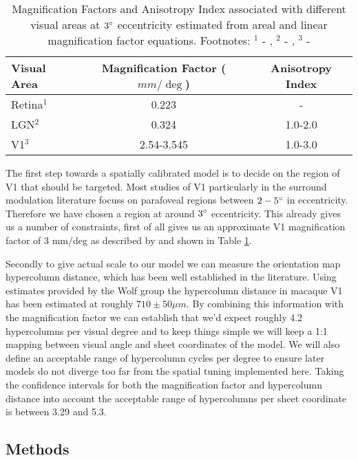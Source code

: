 \begin{table}
\centering
\begin{tabular}{l | c c}
  \hline
  \hline
  Visual Area     & Magnification Factor ($mm/\deg$) & Anisotropy Index \\
  \hline
  Retina$^1$      & 0.223                            & -                      \\
  LGN$^2$         & 0.324                             & 1.0-2.0                \\
  V1$^3$          & 2.54-3.545                       & 1.0-3.0                \\
  \hline
\end{tabular}
\caption[]%
{Magnification Factors and Anisotropy Index associated with different visual areas at $3\degree$ eccentricity estimated from areal and linear magnification factor equations. Footnotes: $^1$ - \cite{Perry1985}, $^2$ - \cite{Connolly1984}, $^3$ - \cite{VanEssen1984}}
\label{MFs}
\end{table}

The first step towards a spatially calibrated model is to decide on
the region of V1 that should be targeted. Most studies of V1
particularly in the surround modulation literature focuss on parafoveal
regions between $2-5\degree$ in eccentricity. Therefore we have chosen
a region at around $3\degree$ eccentricity. This already gives us a
number of constraints, first of all gives us an approximate V1
magnification factor of 3 mm/deg as described by \cite{VanEssen1984}
and shown in Table \ref{MFs}.

Secondly to give actual scale to our model we can measure the
orientation map hypercolumn distance, which has been well established
in the literature. Using estimates provided by the Wolf group the
hypercolumn distance in macaque V1 has been estimated at roughly \(710
\pm 50 \mu m\). By combining this information with the magnification
factor we can establish that we'd expect roughly 4.2 hypercolumns per
visual degree and to keep things simple we will keep a 1:1 mapping
between visual angle and sheet coordinates of the model. We will also
define an acceptable range of hypercolumn cycles per degree to ensure
later models do not diverge too far from the spatial tuning
implemented here. Taking the confidence intervals for both the
magnification factor and hypercolumn distance into account the
acceptable range of hypercolumns per sheet coordinate is between 3.29
and 5.3.

\subsection{Methods}

